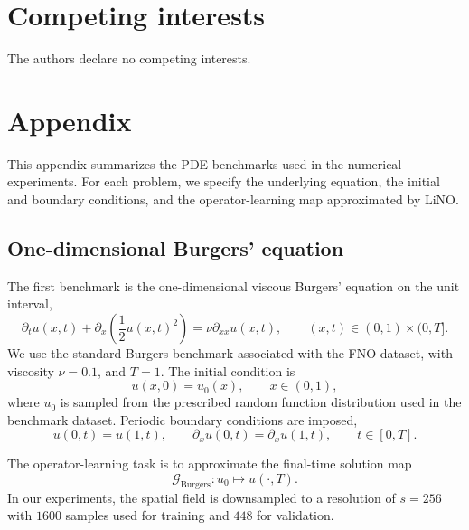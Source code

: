 \documentclass{article}
\begin{document}


\section*{Competing interests}
The authors declare no competing interests.

\appendix

\section{Appendix}
\label{app:benchmark-pdes}

This appendix summarizes the PDE benchmarks used in the numerical experiments. 
For each problem, we specify the underlying equation, the initial and boundary 
conditions, and the operator-learning map approximated by LiNO.

\subsection{One-dimensional Burgers' equation}
\label{app:burgers}

The first benchmark is the one-dimensional viscous Burgers' equation on the unit interval,
\begin{equation}
    \partial_t u(x,t)
    +
    \partial_x\left(\frac{1}{2}u(x,t)^2\right)
    =
    \nu \partial_{xx}u(x,t),
    \qquad
    (x, t)\in (0,1)\times(0,T].
    \label{eq:app-burgers}
\end{equation}
We use the standard Burgers benchmark associated with the FNO dataset, with viscosity $\nu = 0.1$, and $T = 1$.
The initial condition is
\begin{equation}
    u(x,0)=u_0(x),
    \qquad x\in(0,1),
    \label{eq:app-burgers-ic}
\end{equation}
where $u_0$ is sampled from the prescribed random function distribution used in the benchmark dataset. 
Periodic boundary conditions are imposed,
\begin{equation}
    u(0,t)=u(1,t),
    \qquad
    \partial_x u(0,t)=\partial_x u(1,t),
    \qquad t\in[0,T].
    \label{eq:app-burgers-bc}
\end{equation}

The operator-learning task is to approximate the final-time solution map
\begin{equation}
    \mathcal{G}_{\mathrm{Burgers}}:
    u_0 \mapsto u(\cdot,T).
    \label{eq:app-burgers-map}
\end{equation}
In our experiments, the spatial field is downsampled to a resolution of $s = 256$ with $1600$ samples used for training and $448$ for validation.
\end{document}
